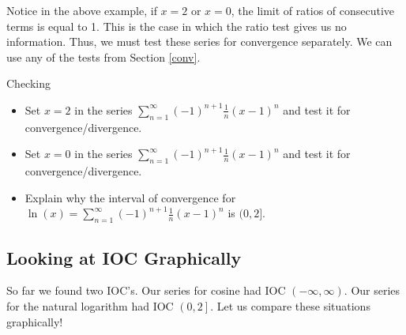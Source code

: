 Notice in the above example, if $x=2$ or $x=0$, the limit of ratios of consecutive terms is equal to 1.  This is the case in which the ratio test gives us no information.  Thus, we must test these series for convergence separately.  We can use any of the tests from Section \ref{conv}.   

\begin{exercise}{Checking  \Coffeecup \Coffeecup }
\begin{itemize}
\item Set $x=2$ in the series $\sum_{n=1}^\infty (-1)^{n+1}\frac{1}{n}(x-1)^{n}$ and test it for convergence/divergence.
\vspace*{1in}
\item Set $x=0$ in the series $\sum_{n=1}^\infty (-1)^{n+1}\frac{1}{n}(x-1)^{n}$ and test it for convergence/divergence.
\vspace*{1in}
\item Explain why the interval of convergence for $\ln(x)=\sum_{n=1}^\infty (-1)^{n+1}\frac{1}{n}(x-1)^{n}$ is $(0,2]$.
\vspace*{1in}
\end{itemize}
\end{exercise}

\subsection{Looking at IOC Graphically}

So far we found two IOC's.  Our series for cosine had IOC $\left(-\infty,\infty\right)$.  Our series for the natural logarithm had IOC $\left(0,2\right]$.  Let us compare these situations graphically!

